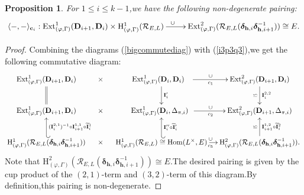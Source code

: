 \documentclass[SecEq,CM,GP]{degruyter-crelle} %
\theoremstyle{plain}
\newtheorem{pro}[thm]{Proposition}
\newcommand{\Dpik}{{\mathbf{D}}}
\newcommand{\ext}{{\rm Ext}}
\newcommand{\homo}{{\rm Hom}}
\newcommand{\hH}{{\mathrm{H}}}
\newcommand{\bc}{{\mathbf{c}}}
\newcommand{\bh}{{\mathbf{h}}}
\newcommand{\cR}{\mathcal R}
\begin{document}
\begin{pro}\label{pairingdef}For $1\leq i\leq k-1$,\;we have the following non-degenerate pairing:
\begin{equation}
	\xymatrix{
		\langle -,-\rangle_{\bc_i}: \ext^1_{(\varphi,\Gamma)}(\Dpik_{i+1},\Dpik_{i})  \times  \hH^1_{(\varphi,\Gamma)}(\cR_{E,L}) \ar[r]^{\hspace{20pt}\cup}
		& \ext^2_{(\varphi,\Gamma)}(\cR_{E,L}(\bm{\delta}_{\bh,i}\bm{\delta}^{-1}_{\bh,i+1}))\cong E.}
\end{equation}
\end{pro}
\begin{proof}Combining the  diagrams (\ref{bigcommutediag}) with  (\ref{i3p3q3}),\;we get the following commutative diagram:
\begin{equation}
	\xymatrix@C=2.5ex{
		\ext^1_{(\varphi,\Gamma)}(\Dpik_{i+1},\Dpik_{i}) \ar@{=}[d]                        & \times & \ext^1_{(\varphi,\Gamma)}(\Dpik_{i},\Dpik_{i})\hspace{9pt} \ar[d]^{ {\mathbf{I}}'_{i}}         \ar[r]^{\cup}_{c_1}
		& \ext^2_{(\varphi,\Gamma)}(\Dpik_{i+1},\Dpik_{i}) \ar[d]_{\backsimeq}^{{\mathbf{I}}_{i}^{2,2}} \\
		\ext^1_{(\varphi,\Gamma)}(\Dpik_{i+1},\Dpik_{i})           & \times & \ext^1_{(\varphi,\Gamma)}(\Dpik_{i},\Delta_{\pi,i})\hspace{5pt}                 \ar[r]^{\cup}_{c_2}
		& \ext^2_{(\varphi,\Gamma)}(\Dpik_{i+1},\Delta_{\pi,i})          \\
		\hH^1_{(\varphi,\Gamma)}(\cR_{E,L}(\bm{\delta}_{\bh,i}\bm{\delta}_{\bh,i+1}^{-1})) \ar@{_(->}[u]_{({\mathbf{I}}_{i}^{2,1})^{-1}\circ {\mathbf{I}}_{i+1}^{1,1}\circ \widetilde{\mathbf{I}}_{i}^1}  & \times & \hH^1_{(\varphi,\Gamma)}(\cR_{E,L})\cong \homo(L^\times,E)   \ar@{_(->}[u]_{ {\mathbf{I}}''_{i}\circ  \widetilde{\mathbf{I}}'_{i}}         \ar[r]^{\cup}_{c_5}
		&\hH^2_{(\varphi,\Gamma)}(\cR_{E,L}(\bm{\delta}_{\bh,i}\bm{\delta}_{\bh,i+1}^{-1})) \ar[u]^{\backsimeq}_{{\mathbf{I}}_{i+1}^{1,2}\circ \widetilde{\mathbf{I}}_{i}^2}.
	}
\end{equation}
Note that $\hH^2_{(\varphi,\Gamma)}(\cR_{E,L}(\bm{\delta}_{\bh,i}\bm{\delta}_{\bh,i+1}^{-1}))\cong E$.\;The desired pairing is given by the cup product of the $(2,1)$-term and $(3,2)$-term of this diagram.\;By definition,\;this pairing is non-degenerate.\;
\end{proof}

\end{document}
